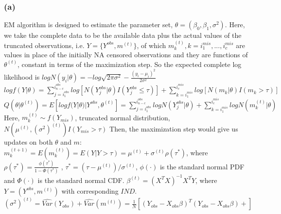 \documentclass{article}
\begin{document}
\subsubsection*{(a)}
\hspace{12 pt} EM algorithm is designed to estimate the parameter set, $\theta = (\beta_0,\beta_1,\sigma^2)$. Here, we take the complete data to be
the available data plus the actual values of the truncated observations, i.e. $Y=\{Y^{obs}, m^{(t)}\}$, of which 
$m_k^{(t)}, k=i^{mis}_1,...,i^{mis}_c$ are values in place of the initially NA censored 
observations and they are functions of $\theta^{(t)}$, constant in terms of the maximization step.  
So the expected complete log likelihood is \newline
$logN(y_i|\theta) = \displaystyle -log\sqrt{2\pi\sigma^2} - \frac{(y_i-\mu_i)^2}{2\sigma^2}$ \newline
$logf(Y|\theta) =\displaystyle \sum_{j=i^{obs}_1}^{i^{obs}_{n-c}} log[N(Y^{obs}_{j}|\theta)I(Y^{obs}_{j}\leq \tau)]
                             + \sum_{k=i^{mis}_1}^{i^{mis}_c} log[N(m_k|\theta)I(m_k > \tau)] $ \newline
$Q(\theta|\theta^{(t)}) = \displaystyle E[logf(Y|\theta)|Y^{obs},\theta^{(t)}]
                        = \sum_{j=i^{obs}_1}^{i^{obs}_{n-c}} logN(Y^{obs}_{j}|\theta) 
                        + \sum_{k=i^{mis}_1}^{i^{mis}_c} logN(m_k^{(t)}|\theta) $ \newline
Here, $m_k^{(t)}\sim f(Y_{mis})$, truncated normal distribution,$N(\mu^{(t)},(\sigma^2)^{(t)})I(Y_{mis} > \tau)$ \newline
\hspace{12 pt} Then, the maximization step would give us updates on both $\theta$ and $m$:\newline
$m_k^{(t+1)} = E(m_k^{(t)}) = E(Y|Y > \tau) = \mu^{(t)} + \sigma^{(t)}\rho(\tau^*)$,
where $\displaystyle \rho(\tau^*) = \frac{\phi(\tau^*)}{1-\Phi(\tau^*)}$ , $\tau^*=(\tau-\mu^{(t)})/\sigma^{(t)}$, 
$\phi(\cdot)$ is the standard normal PDF and $\Phi(\cdot)$ is the standard normal CDF. \newline
$\beta^{(t)} = (X^TX)^{-1}X^TY$, where $Y=(Y^{obs}, m^{(t)})$ with corresponding $IND$. \newline
$\displaystyle (\sigma^2)^{(t)} = \widehat{Var}(Y_{obs})+\widehat{Var}(m^{(t)})
                                = \frac{1}{N}[(Y_{obs}-X_{obs}\beta)^T(Y_{obs}-X_{obs}\beta) 
                                              + ]$
\end{document}
